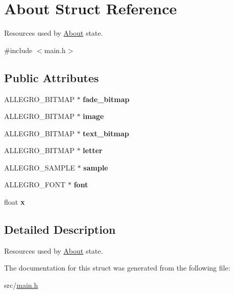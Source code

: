 \hypertarget{structAbout}{\section{\-About \-Struct \-Reference}
\label{structAbout}
}


\-Resources used by \hyperlink{structAbout}{\-About} state.  




{\ttfamily \#include $<$main.\-h$>$}

\subsection*{\-Public \-Attributes}
\begin{DoxyCompactItemize}
\item 
\hypertarget{structAbout_a0c80b08e1d60093504bed342b41e51c1}{\-A\-L\-L\-E\-G\-R\-O\-\_\-\-B\-I\-T\-M\-A\-P $\ast$ {\bfseries fade\-\_\-bitmap}}\label{structAbout_a0c80b08e1d60093504bed342b41e51c1}

\item 
\hypertarget{structAbout_a9e724aa84d322d2bfff5c00109492a1d}{\-A\-L\-L\-E\-G\-R\-O\-\_\-\-B\-I\-T\-M\-A\-P $\ast$ {\bfseries image}}\label{structAbout_a9e724aa84d322d2bfff5c00109492a1d}

\item 
\hypertarget{structAbout_a2e5dbd59393791949fd988de7b770f86}{\-A\-L\-L\-E\-G\-R\-O\-\_\-\-B\-I\-T\-M\-A\-P $\ast$ {\bfseries text\-\_\-bitmap}}\label{structAbout_a2e5dbd59393791949fd988de7b770f86}

\item 
\hypertarget{structAbout_aa46380e60629ac39d782e18dc6a08f8e}{\-A\-L\-L\-E\-G\-R\-O\-\_\-\-B\-I\-T\-M\-A\-P $\ast$ {\bfseries letter}}\label{structAbout_aa46380e60629ac39d782e18dc6a08f8e}

\item 
\hypertarget{structAbout_aaae3fb8b349d9973fde2156e1f86c75b}{\-A\-L\-L\-E\-G\-R\-O\-\_\-\-S\-A\-M\-P\-L\-E $\ast$ {\bfseries sample}}\label{structAbout_aaae3fb8b349d9973fde2156e1f86c75b}

\item 
\hypertarget{structAbout_ad14358b4942c0260e502a65b98732f93}{\-A\-L\-L\-E\-G\-R\-O\-\_\-\-F\-O\-N\-T $\ast$ {\bfseries font}}\label{structAbout_ad14358b4942c0260e502a65b98732f93}

\item 
\hypertarget{structAbout_a8ff1ed42ee1abd6ad45def77614015ce}{float {\bfseries x}}\label{structAbout_a8ff1ed42ee1abd6ad45def77614015ce}

\end{DoxyCompactItemize}


\subsection{\-Detailed \-Description}
\-Resources used by \hyperlink{structAbout}{\-About} state. 

\-The documentation for this struct was generated from the following file\-:\begin{DoxyCompactItemize}
\item 
src/\hyperlink{main_8h}{main.\-h}\end{DoxyCompactItemize}
